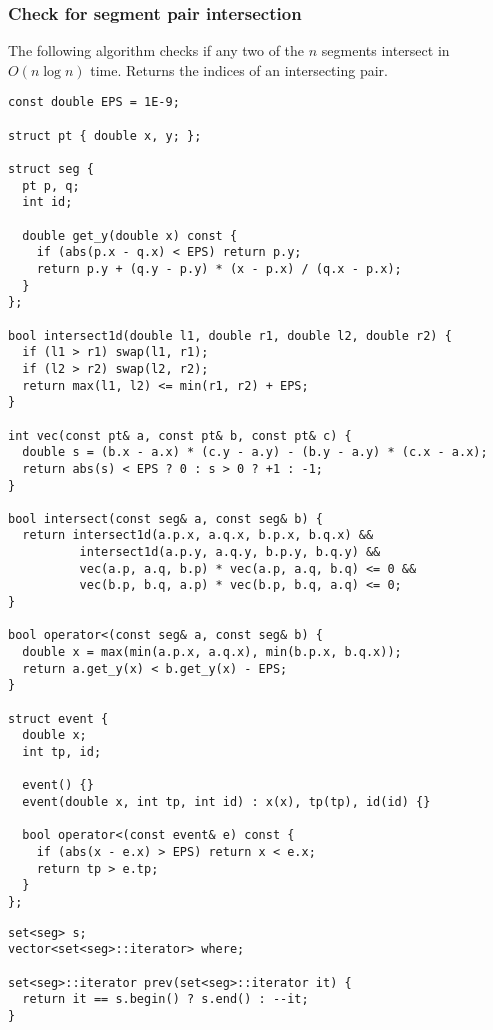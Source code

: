 \newpage
\subsubsection{Check for segment pair intersection}

The following algorithm checks if any two of the $n$ segments intersect in $O(n \log{n})$ time.
Returns the indices of an intersecting pair.


\begin{center}
\begin{minipage}[t]{0.45\linewidth}
\begin{lstlisting}
const double EPS = 1E-9;

struct pt { double x, y; };

struct seg {
  pt p, q;
  int id;

  double get_y(double x) const {
    if (abs(p.x - q.x) < EPS) return p.y;
    return p.y + (q.y - p.y) * (x - p.x) / (q.x - p.x);
  }
};

bool intersect1d(double l1, double r1, double l2, double r2) {
  if (l1 > r1) swap(l1, r1);
  if (l2 > r2) swap(l2, r2);
  return max(l1, l2) <= min(r1, r2) + EPS;
}

int vec(const pt& a, const pt& b, const pt& c) {
  double s = (b.x - a.x) * (c.y - a.y) - (b.y - a.y) * (c.x - a.x);
  return abs(s) < EPS ? 0 : s > 0 ? +1 : -1;
}

bool intersect(const seg& a, const seg& b) {
  return intersect1d(a.p.x, a.q.x, b.p.x, b.q.x) &&
          intersect1d(a.p.y, a.q.y, b.p.y, b.q.y) &&
          vec(a.p, a.q, b.p) * vec(a.p, a.q, b.q) <= 0 &&
          vec(b.p, b.q, a.p) * vec(b.p, b.q, a.q) <= 0;
}

bool operator<(const seg& a, const seg& b) {
  double x = max(min(a.p.x, a.q.x), min(b.p.x, b.q.x));
  return a.get_y(x) < b.get_y(x) - EPS;
}

struct event {
  double x;
  int tp, id;

  event() {}
  event(double x, int tp, int id) : x(x), tp(tp), id(id) {}

  bool operator<(const event& e) const {
    if (abs(x - e.x) > EPS) return x < e.x;
    return tp > e.tp;
  }
};
\end{lstlisting}
\end{minipage}
\qquad
\begin{minipage}[t]{0.5\linewidth}
\begin{lstlisting}
set<seg> s;
vector<set<seg>::iterator> where;

set<seg>::iterator prev(set<seg>::iterator it) {
  return it == s.begin() ? s.end() : --it;
}


\end{lstlisting}
\end{minipage}
\end{center}
